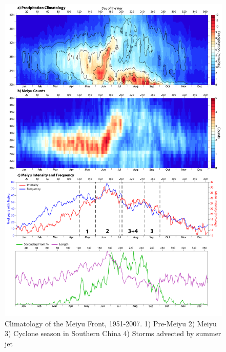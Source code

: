 \documentclass[draft,grl]{AGUTeX}
\begin{document}
%
%
%
%
%


\begin{figure}
\label{algo}
\end{figure}


\begin{figure}
\noindent\includegraphics[width=36pc]{Figures/fig1_dingchan.pdf}
\caption{Climatology of the Meiyu Front, 1951-2007. 1) Pre-Meiyu 2) Meiyu 3) Cyclone season in Southern China 4) Storms advected by summer jet}
\label{dingchan}
\end{figure}
\end{document}
